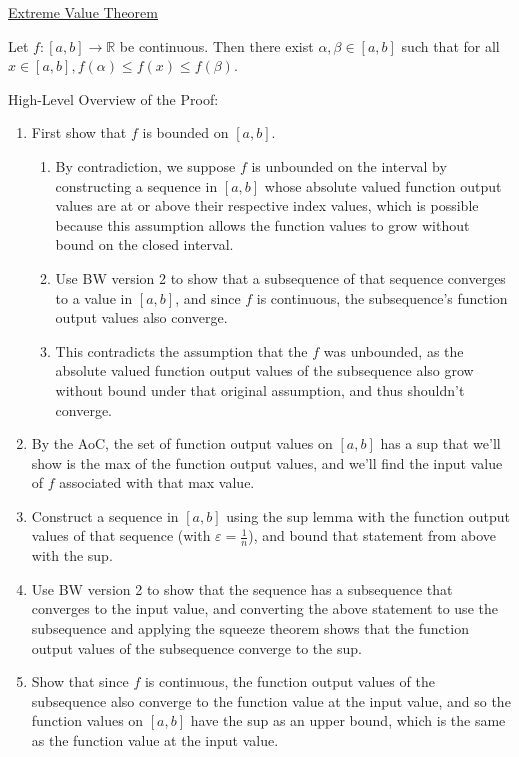 \documentclass[12pt]{article}
\newcommand{\RR}{\mathbb{R}} %
\newcommand{\eps}{\varepsilon}
\begin{document}
\pagebreak

\underline{Extreme Value Theorem}

Let $f : [a, b] \rightarrow \RR$ be continuous. Then there exist $\alpha, \beta \in [a, b]$ such that for all $x \in [a, b], f(\alpha) \le f(x) \le f(\beta)$.

\dotfill

High-Level Overview of the Proof:

\begin{enumerate}
\item First show that $f$ is bounded on $[a, b]$.
\begin{enumerate}
\item By contradiction, we suppose $f$ is unbounded on the interval by constructing a sequence in $[a, b]$ whose absolute valued function output values are at or above their respective index values, which is possible because this assumption allows the function values to grow without bound on the closed interval.

\item Use BW version 2 to show that a subsequence of that sequence converges to a value in $[a, b]$, and since $f$ is continuous, the subsequence's function output values also converge.

\item This contradicts the assumption that the $f$ was unbounded, as the absolute valued function output values of the subsequence also grow without bound under that original assumption, and thus shouldn't converge.
\end{enumerate}

\item By the AoC, the set of function output values on $[a, b]$ has a sup that we'll show is the max of the function output values, and we'll find the input value of $f$ associated with that max value.

\item Construct a sequence in $[a, b]$ using the sup lemma with the function output values of that sequence (with $\eps = \frac{1}{n}$), and bound that statement from above with the sup.

\item Use BW version 2 to show that the sequence has a subsequence that converges to the input value, and converting the above statement to use the subsequence and applying the squeeze theorem shows that the function output values of the subsequence converge to the sup.

\item Show that since $f$ is continuous, the function output values of the subsequence also converge to the function value at the input value, and so the function values on $[a, b]$ have the sup as an upper bound, which is the same as the function value at the input value.
\end{enumerate}
\end{document}
